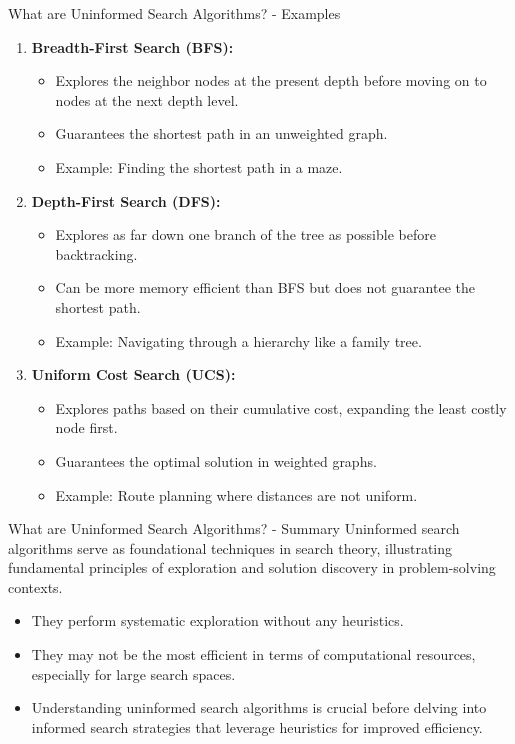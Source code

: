 \documentclass[aspectratio=169]{beamer}
\begin{document}
\begin{frame}[fragile]{What are Uninformed Search Algorithms? - Examples}
    \begin{enumerate}
        \item \textbf{Breadth-First Search (BFS):} 
            \begin{itemize}
                \item Explores the neighbor nodes at the present depth before moving on to nodes at the next depth level.
                \item Guarantees the shortest path in an unweighted graph.
                \item Example: Finding the shortest path in a maze.
            \end{itemize}
        
        \item \textbf{Depth-First Search (DFS):} 
            \begin{itemize}
                \item Explores as far down one branch of the tree as possible before backtracking.
                \item Can be more memory efficient than BFS but does not guarantee the shortest path.
                \item Example: Navigating through a hierarchy like a family tree.
            \end{itemize}

        \item \textbf{Uniform Cost Search (UCS):} 
            \begin{itemize}
                \item Explores paths based on their cumulative cost, expanding the least costly node first.
                \item Guarantees the optimal solution in weighted graphs.
                \item Example: Route planning where distances are not uniform.
            \end{itemize}
    \end{enumerate}
\end{frame}

\begin{frame}[fragile]{What are Uninformed Search Algorithms? - Summary}
    Uninformed search algorithms serve as foundational techniques in search theory, illustrating fundamental principles of exploration and solution discovery in problem-solving contexts. 
    \begin{itemize}
        \item They perform systematic exploration without any heuristics.
        \item They may not be the most efficient in terms of computational resources, especially for large search spaces.
        \item Understanding uninformed search algorithms is crucial before delving into informed search strategies that leverage heuristics for improved efficiency.
    \end{itemize}
\end{frame}
\end{document}
